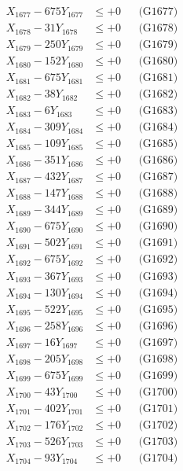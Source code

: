 \documentclass[a4paper,10pt]{article}
\begin{document}
{\begin{align}
X_{1677} - 675Y_{1677} &\leq +0 && \text{(G1677)} \\
X_{1678} - 31Y_{1678} &\leq +0 && \text{(G1678)} \\
X_{1679} - 250Y_{1679} &\leq +0 && \text{(G1679)} \\
X_{1680} - 152Y_{1680} &\leq +0 && \text{(G1680)} \\
\allowbreak
X_{1681} - 675Y_{1681} &\leq +0 && \text{(G1681)} \\
X_{1682} - 38Y_{1682} &\leq +0 && \text{(G1682)} \\
X_{1683} - 6Y_{1683} &\leq +0 && \text{(G1683)} \\
X_{1684} - 309Y_{1684} &\leq +0 && \text{(G1684)} \\
X_{1685} - 109Y_{1685} &\leq +0 && \text{(G1685)} \\
X_{1686} - 351Y_{1686} &\leq +0 && \text{(G1686)} \\
X_{1687} - 432Y_{1687} &\leq +0 && \text{(G1687)} \\
X_{1688} - 147Y_{1688} &\leq +0 && \text{(G1688)} \\
X_{1689} - 344Y_{1689} &\leq +0 && \text{(G1689)} \\
X_{1690} - 675Y_{1690} &\leq +0 && \text{(G1690)} \\
\allowbreak
X_{1691} - 502Y_{1691} &\leq +0 && \text{(G1691)} \\
X_{1692} - 675Y_{1692} &\leq +0 && \text{(G1692)} \\
X_{1693} - 367Y_{1693} &\leq +0 && \text{(G1693)} \\
X_{1694} - 130Y_{1694} &\leq +0 && \text{(G1694)} \\
X_{1695} - 522Y_{1695} &\leq +0 && \text{(G1695)} \\
X_{1696} - 258Y_{1696} &\leq +0 && \text{(G1696)} \\
X_{1697} - 16Y_{1697} &\leq +0 && \text{(G1697)} \\
X_{1698} - 205Y_{1698} &\leq +0 && \text{(G1698)} \\
X_{1699} - 675Y_{1699} &\leq +0 && \text{(G1699)} \\
X_{1700} - 43Y_{1700} &\leq +0 && \text{(G1700)} \\
\allowbreak
X_{1701} - 402Y_{1701} &\leq +0 && \text{(G1701)} \\
X_{1702} - 176Y_{1702} &\leq +0 && \text{(G1702)} \\
X_{1703} - 526Y_{1703} &\leq +0 && \text{(G1703)} \\
X_{1704} - 93Y_{1704} &\leq +0 && \text{(G1704)} \\

\end{align}}
\end{document}
